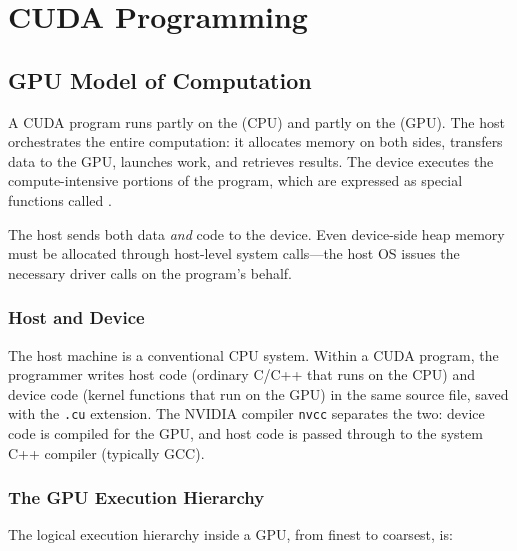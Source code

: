 
\chapter{CUDA Programming}
\label{ch:cuda}

\section{GPU Model of Computation}
\label{sec:gpu-model}

A CUDA program runs partly on the  (CPU) and partly on the
 (GPU). The host orchestrates the entire computation: it
allocates memory on both sides, transfers data to the GPU, launches work, and
retrieves results. The device executes the compute-intensive portions of the
program, which are expressed as special functions called .

\begin{ppkey}
The host sends both data \emph{and} code to the device. Even device-side
heap memory must be allocated through host-level system calls---the host OS
issues the necessary driver calls on the program's behalf.
\end{ppkey}

\subsection{Host and Device}
\label{ssec:host-device}

The host machine is a conventional CPU system. Within a CUDA program, the
programmer writes host code (ordinary C/C++ that runs on the CPU) and device
code (kernel functions that run on the GPU) in the same source file, saved
with the \texttt{.cu} extension. The NVIDIA compiler \texttt{nvcc} separates
the two: device code is compiled for the GPU, and host code is passed through
to the system C++ compiler (typically GCC).

\subsection{The GPU Execution Hierarchy}
\label{ssec:execution-hierarchy}

The logical execution hierarchy inside a GPU, from finest to coarsest, is:


